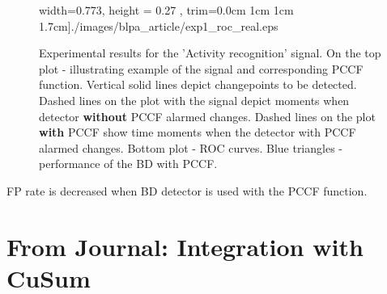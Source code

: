\begin{figure}[!htb]
\begin{minipage}{0.5\textwidth}
{            width=0.773\textwidth, 
            height = 0.27 \textheight,
            trim={0.0cm 1cm 1cm 1.7cm}]{./images/blpa_article/exp1_roc_real.eps}
            }
        \caption{
         Experimental results for the 'Activity recognition' signal.
         On the top plot - illustrating example of the signal and corresponding PCCF function.
         Vertical solid lines depict changepoints to be detected. 
         Dashed lines on the plot with the signal depict moments when detector \textbf{without} PCCF alarmed changes. 
         Dashed lines on the plot \textbf{with} PCCF show time moments when the detector with PCCF alarmed changes.
         Bottom plot - ROC curves. 
        Blue triangles - performance of the BD with PCCF.
            }
            \label{fig:results2}
    \end{minipage}
\end{figure}
FP rate is decreased when BD detector is used with the PCCF function.

\section{From Journal: Integration with CuSum}

